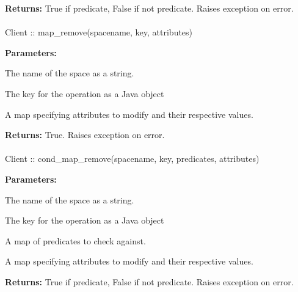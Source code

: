 \noindent\textbf{Returns:}
True if predicate, False if not predicate.  Raises exception on error.

\paragraph{}
\label{api:java:map_remove}
\begin{javacode}
Client :: map_remove(spacename, key, attributes)
\end{javacode}


\noindent\textbf{Parameters:}
\begin{description}[labelindent=\widthof{{\code{attributes}}},leftmargin=*,noitemsep,nolistsep,align=right]
\item[\code{spacename}] The name of the space as a string.
\item[\code{key}] The key for the operation as a Java object
\item[\code{attributes}] A map specifying attributes to modify and their respective values.
\end{description}

\noindent\textbf{Returns:}
True.  Raises exception on error.

\paragraph{}
\label{api:java:cond_map_remove}
\begin{javacode}
Client :: cond_map_remove(spacename, key, predicates, attributes)
\end{javacode}


\noindent\textbf{Parameters:}
\begin{description}[labelindent=\widthof{{\code{predicates}}},leftmargin=*,noitemsep,nolistsep,align=right]
\item[\code{spacename}] The name of the space as a string.
\item[\code{key}] The key for the operation as a Java object
\item[\code{predicates}] A map of predicates to check against.
\item[\code{attributes}] A map specifying attributes to modify and their respective values.
\end{description}

\noindent\textbf{Returns:}
True if predicate, False if not predicate.  Raises exception on error.

